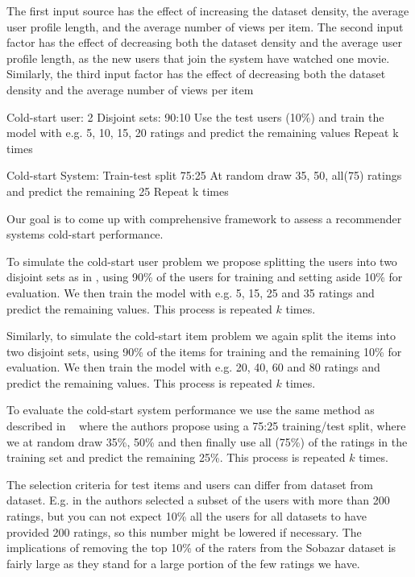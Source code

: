 The first input source has the effect of increasing the dataset density, the average user profile length, and the
average number of views per item. The second input factor has the effect of decreasing both the dataset density
and the average user profile length, as the new users that join the system have watched one movie. Similarly,
the third input factor has the effect of decreasing both the dataset density and the average number of views per
item

Cold-start user:
2 Disjoint sets: 90:10
Use the test users (10\%) and train the model with e.g. 5, 10, 15, 20 ratings and predict the remaining values
Repeat k times


Cold-start System:
Train-test split 75:25
At random draw 35, 50, all(75) ratings and predict the remaining 25
Repeat k times


Our goal is to come up with comprehensive framework to assess a recommender systems cold-start performance.




To simulate the cold-start user problem we propose splitting the users into two disjoint sets as in \cite{Stern2009, Lam2008},
using 90\% of the users for training and setting aside 10\% for evaluation. We then train the model with e.g. 5, 15, 25 and 35
ratings and predict the remaining values. This process is repeated $k$ times.

Similarly, to simulate the cold-start item problem we again split the items into two disjoint sets,
 using 90\% of the items for training and the remaining 10\% for evaluation.  We then train the model
 with e.g. 20, 40, 60 and 80 ratings and predict the remaining values. This process is repeated $k$ times.

To evaluate the cold-start system performance we use the same method as described in ~\cite{Agarwal2009}
where the authors propose using a 75:25 training/test split, where we at random draw 35\%, 50\%
and then finally use all (75\%) of the ratings in the training set and predict the remaining 25\%. This process is repeated $k$ times.

The selection criteria for test items and users can differ from dataset from dataset. E.g. in \cite{Rashid2002, Rashid2008}
the authors selected a subset of the users with more than 200 ratings, but you can not expect 10\% all the users for all datasets
to have provided 200 ratings, so this number might be lowered if necessary. The implications of removing the top 10\% of
the raters from the Sobazar dataset is fairly large as they stand for a large portion of the few ratings we have.

